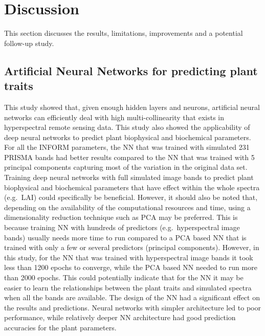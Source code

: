 \documentclass[a4paper, twoside]{templates/ociamthesis}
\begin{document}
\hypertarget{discussion}{%
\chapter{Discussion}\label{discussion}}

This section discusses the results, limitations, improvements and a potential follow-up study.

\hypertarget{artificial-neural-networks-for-predicting-plant-traits}{%
\section{Artificial Neural Networks for predicting plant traits}\label{artificial-neural-networks-for-predicting-plant-traits}}

This study showed that, given enough hidden layers and neurons, artificial neural networks can efficiently deal with high multi-collinearity that exists in hyperspectral remote sensing data. This study also showed the applicability of deep neural networks to predict plant biophysical and biochemical parameters. For all the INFORM parameters, the NN that was trained with simulated 231 PRISMA bands had better results compared to the NN that was trained with 5 principal components capturing most of the variation in the original data set. Training deep neural networks with full simulated image bands to predict plant biophysical and biochemical parameters that have effect within the whole spectra (e.g.~LAI) could specifically be beneficial. However, it should also be noted that, depending on the availability of the computational resources and time, using a dimensionality reduction technique such as PCA may be preferred. This is because training NN with hundreds of predictors (e.g.~hyperspectral image bands) usually needs more time to run compared to a PCA based NN that is trained with only a few or several predictors (principal components). However, in this study, for the NN that was trained with hyperspectral image bands it took less than 1200 epochs to converge, while the PCA based NN needed to run more than 2000 epochs. This could potentially indicate that for the NN it may be easier to learn the relationships between the plant traits and simulated spectra when all the bands are available. The design of the NN had a significant effect on the results and predictions. Neural networks with simpler architecture led to poor performance, while relatively deeper NN architecture had good prediction accuracies for the plant parameters.
\end{document}
